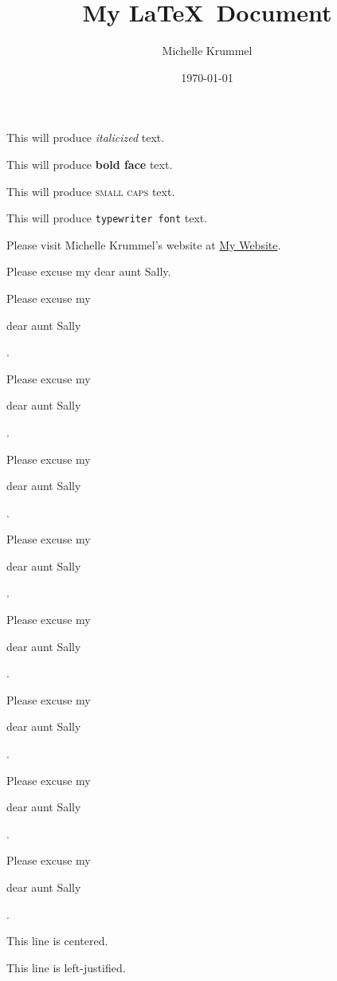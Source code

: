 \documentclass[11pt]{article}
\title{My \LaTeX\ Document}
\author{Michelle Krummel}
\date{\today}
\begin{document}
\tableofcontents
\maketitle

This will produce \textit{italicized} text.

This will produce \textbf{bold face} text.

This will produce \textsc{small caps} text.

This will produce \texttt{typewriter font} text.

Please visit Michelle Krummel's website at \href{http://michellekrummel.com}{My Website}.

\vspace{1cm}

Please excuse my dear aunt Sally.

Please excuse my \begin{large}dear aunt Sally\end{large}.

Please excuse my \begin{Large}dear aunt Sally\end{Large}.

Please excuse my \begin{huge}dear aunt Sally\end{huge}.

Please excuse my \begin{Huge}dear aunt Sally\end{Huge}.

Please excuse my \begin{normalsize}dear aunt Sally\end{normalsize}.

Please excuse my \begin{small}dear aunt Sally\end{small}.

Please excuse my \begin{scriptsize}dear aunt Sally\end{scriptsize}.

Please excuse my \begin{tiny}dear aunt Sally\end{tiny}.

\vspace{1cm}

\begin{center}This line is centered.\end{center}

\begin{flushleft}This line is left-justified.\end{flushleft}
\end{document}
